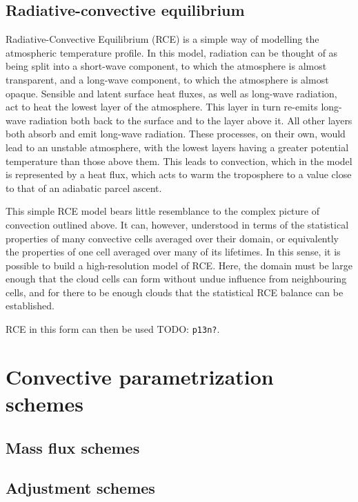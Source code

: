 \documentclass[11pt,a4paper]{article}
\newcommand{\todo}{TODO: \texttt}
\begin{document}
\subsection{Radiative-convective equilibrium}

Radiative-Convective Equilibrium (RCE) is a simple way of modelling the atmospheric temperature profile. In this model, radiation can be thought of as being split into a short-wave component, to which the atmosphere is almost transparent, and a long-wave component, to which the atmosphere is almost opaque. Sensible and latent surface heat fluxes, as well as long-wave radiation, act to heat the lowest layer of the atmosphere. This layer in turn re-emits long-wave radiation both back to the surface and to the layer above it. All other layers both absorb and emit long-wave radiation. These processes, on their own, would lead to an unstable atmosphere, with the lowest layers having a greater potential temperature than those above them. This leads to convection, which in the model is represented by a heat flux, which acts to warm the troposphere to a value close to that of an adiabatic parcel ascent.

This simple RCE model bears little resemblance to the complex picture of convection outlined above. It can, however, understood in terms of the statistical properties of many convective cells averaged over their domain, or equivalently the properties of one cell averaged over many of its lifetimes. In this sense, it is possible to build a high-resolution model of RCE. Here, the domain must be large enough that the cloud cells can form without undue influence from neighbouring cells, and for there to be enough clouds that the statistical RCE balance can be established. 

RCE in this form can then be used \todo{p13n?}.

\section{Convective parametrization schemes}

\subsection{Mass flux schemes}

\cite{kain1993convection}

\subsection{Adjustment schemes}

\cite{manabe1965simulated}

\cite{betts1986new}

\newpage
\printbibliography[title={References}]

\end{document}
